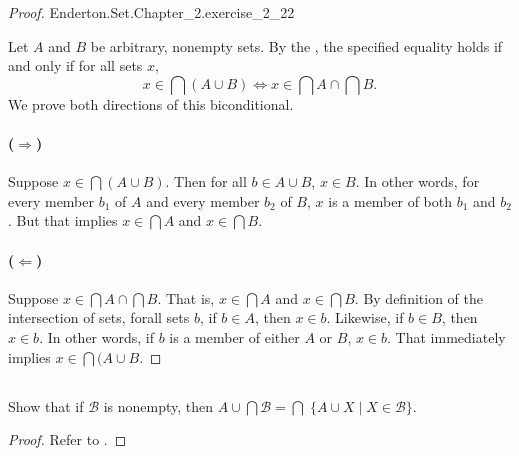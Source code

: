 \documentclass{report}
\begin{document}
\begin{proof}

    {Enderton.Set.Chapter\_2.exercise\_2\_22}

  Let $A$ and $B$ be arbitrary, nonempty sets.
  By the , the specified equality holds if and
    only if for all sets $x$,
    \begin{equation}
      \label{sub:exercise-2.22-eq1}
      x \in \bigcap (A \cup B) \iff x \in \bigcap A \cap \bigcap B.
    \end{equation}
  We prove both directions of this biconditional.

  \paragraph{($\Rightarrow$)}%

    Suppose $x \in \bigcap (A \cup B)$.
    Then for all $b \in A \cup B$, $x \in B$.
    In other words, for every member $b_1$ of $A$ and every member $b_2$ of $B$,
      $x$ is a member of both $b_1$ and $b_2$.
    But that implies $x \in \bigcap A$ and $x \in \bigcap B$.

  \paragraph{($\Leftarrow$)}%

    Suppose $x \in \bigcap A \cap \bigcap B$.
    That is, $x \in \bigcap A$ and $x \in \bigcap B$.
    By definition of the intersection of sets, forall sets $b$, if $b \in A$,
      then $x \in b$.
    Likewise, if $b \in B$, then $x \in b$.
    In other words, if $b$ is a member of either $A$ or $B$, $x \in b$.
    That immediately implies $x \in \bigcap (A \cup B$.

\end{proof}

\subsection{}%
\label{sub:exercise-2.23}

Show that if $\mathscr{B}$ is nonempty, then
  $A \cup \bigcap \mathscr{B} = \bigcap\; \{A \cup X \mid X \in \mathscr{B} \}$.

\begin{proof}

  Refer to .

\end{proof}
\end{document}
